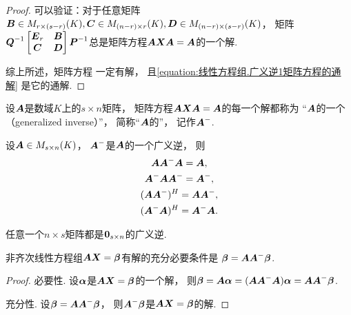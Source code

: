\begin{theorem}[广义逆存在定理]
\begin{proof}
可以验证：对于任意矩阵\(
	\boldsymbol{B} \in M_{r \times (s-r)}(K),
	\boldsymbol{C} \in M_{(n-r) \times r}(K),
	\boldsymbol{D} \in M_{(n-r) \times (s-r)}(K)
\)，
矩阵\(
	\boldsymbol{Q}^{-1}
	\begin{bmatrix}
		\boldsymbol{E}_r & \boldsymbol{B} \\
		\boldsymbol{C} & \boldsymbol{D}
	\end{bmatrix}
	\boldsymbol{P}^{-1}
\)总是矩阵方程\(\boldsymbol{A} \boldsymbol{X} \boldsymbol{A} = \boldsymbol{A}\)的一个解.

综上所述，矩阵方程  一定有解，
且\cref{equation:线性方程组.广义逆1矩阵方程的通解} 是它的通解.
\end{proof}
\end{theorem}

\begin{definition}
设\(\boldsymbol{A}\)是数域\(K\)上的\(s \times n\)矩阵，
矩阵方程\(\boldsymbol{A} \boldsymbol{X} \boldsymbol{A} = \boldsymbol{A}\)的每一个解都称为
“\(\boldsymbol{A}\)的一个（generalized inverse）”，
简称“\(\boldsymbol{A}\)的”，
记作\(\boldsymbol{A}^-\).
\end{definition}

\begin{property}\label{theorem:线性方程组.广义逆的性质1}
设\(\boldsymbol{A} \in M_{s \times n}(K)\)，
\(\boldsymbol{A}^-\)是\(\boldsymbol{A}\)的一个广义逆，
则\begin{gather}
	\boldsymbol{A} \boldsymbol{A}^-\boldsymbol{A} = \boldsymbol{A}, \\
	\boldsymbol{A}^-\boldsymbol{A} \boldsymbol{A}^- = \boldsymbol{A}^-, \\
	(\boldsymbol{A} \boldsymbol{A}^-)^H = \boldsymbol{A} \boldsymbol{A}^-, \\
	(\boldsymbol{A}^-\boldsymbol{A})^H = \boldsymbol{A}^-\boldsymbol{A}.
\end{gather}
\end{property}

\begin{property}\label{theorem:线性方程组.广义逆的性质2}
任意一个\(n \times s\)矩阵都是\(\boldsymbol0_{s \times n}\)的广义逆.
\end{property}

\begin{theorem}[非齐次线性方程组的相容性定理]\label{theorem:线性方程组.非齐次线性方程组的相容性定理}
非齐次线性方程组\(\boldsymbol{A} \boldsymbol{X} = \boldsymbol\beta\)有解的充分必要条件是
\(\boldsymbol\beta = \boldsymbol{A} \boldsymbol{A}^- \boldsymbol\beta\).
\begin{proof}
必要性.
设\(\boldsymbol\alpha\)是\(\boldsymbol{A} \boldsymbol{X} = \boldsymbol\beta\)的一个解，
则\(
	\boldsymbol\beta
	= \boldsymbol{A} \boldsymbol\alpha
	= (\boldsymbol{A} \boldsymbol{A}^- \boldsymbol{A}) \boldsymbol\alpha
	= \boldsymbol{A} \boldsymbol{A}^- \boldsymbol\beta
\).

充分性.
设\(\boldsymbol\beta = \boldsymbol{A} \boldsymbol{A}^- \boldsymbol\beta\)，
则\(\boldsymbol{A}^- \boldsymbol\beta\)是\(\boldsymbol{A} \boldsymbol{X} = \boldsymbol\beta\)的解.
\end{proof}
\end{theorem}

